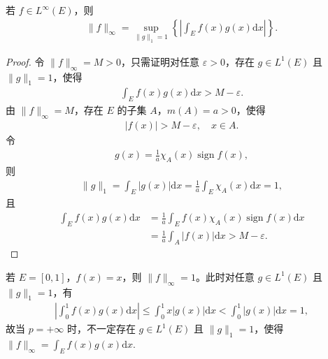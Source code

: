 \documentclass[../../main.tex]{subfiles}%
\begin{document}
\begin{theorem}\label{theorem:L无穷空间范数对偶刻画}
若 $f\in L^\infty(E)$，则
\begin{align*}
\|f\|_\infty = \sup_{\|g\|_1=1} \left\{ \left| \int_E f(x)g(x)\mathrm{d}x \right| \right\}.
\end{align*}
\end{theorem}
\begin{proof}
令 $\|f\|_\infty = M>0$，只需证明对任意 $\varepsilon>0$，存在 $g\in L^1(E)$ 且 $\|g\|_1=1$，使得
\begin{align*}
\int_E f(x)g(x)\mathrm{d}x > M - \varepsilon.
\end{align*}
由 $\|f\|_\infty=M$，存在 $E$ 的子集 $A$，$m(A)=a>0$，使得
\begin{align*}
|f(x)| > M - \varepsilon, \quad x\in A.
\end{align*}
令
\begin{align*}
g(x) = \frac{1}{a} \chi_A(x) \operatorname{sign} f(x),
\end{align*}
则
\begin{align*}
\|g\|_1 = \int_E |g(x)|\mathrm{d}x = \frac{1}{a} \int_E \chi_A(x)\mathrm{d}x = 1,
\end{align*}
且
\begin{align*}
\int_E f(x)g(x)\mathrm{d}x &= \frac{1}{a} \int_E f(x)\chi_A(x)\operatorname{sign} f(x)\mathrm{d}x \\
&= \frac{1}{a} \int_A |f(x)|\mathrm{d}x > M - \varepsilon.
\end{align*}
\end{proof}

\begin{remark}
若 $E=[0,1]$，$f(x)=x$，则 $\|f\|_\infty=1$。此时对任意 $g\in L^1(E)$ 且 $\|g\|_1=1$，有
\begin{align*}
\left| \int_0^1 f(x)g(x)\mathrm{d}x \right| \leqslant \int_0^1 x|g(x)|\mathrm{d}x < \int_0^1 |g(x)|\mathrm{d}x = 1,
\end{align*}
故当 $p=+\infty$ 时，不一定存在 $g\in L^1(E)$ 且 $\|g\|_1=1$，使得 $\|f\|_\infty = \int_E f(x)g(x)\mathrm{d}x$.
\end{remark}
\end{document}
